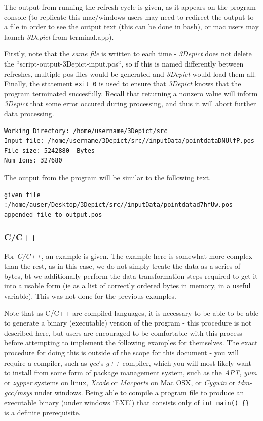 \documentclass[10pt]{article}
\begin{document}
The output from running the refresh cycle is given, as it appears on the program console (to replicate this mac/windows users may need to redirect the output to a file in order to see the output text (this can be done in bash), or mac users may launch \emph{3Depict} from terminal.app).

Firstly, note that the \emph{same file} is written to each time - \emph{3Depict} does not delete the ``script-output-3Depict-input.pos``, so if this is named differently between refreshes, multiple pos files would be generated and \emph{3Depict} would load them all. Finally, the statement \texttt{exit 0} is used to ensure that \emph{3Depict} knows that the program terminated succesfully. Recall that returning a nonzero value will inform \emph{3Depict} that some error occured during processing, and thus it will abort further data processing.

\begin{verbatim}
Working Directory: /home/username/3Depict/src
Input file: /home/username/3Depict/src//inputData/pointdataDNUlfP.pos
File size: 5242880  Bytes
Num Ions: 327680
\end{verbatim}

The output from the program will be similar to the following text.
\begin{verbatim}
given file :/home/auser/Desktop/3Depict/src//inputData/pointdatad7hfUw.pos
appended file to output.pos
\end{verbatim}

\subsubsection{C/C++}
For \emph{C/C++}, an example is given. The example here is somewhat more complex than the rest, as in this case, we do not simply treate the data as a series of bytes, bt we additionally perform the data transformation steps required to get it into a usable form (ie as a list of correctly ordered bytes in memory, in a useful variable). This was not done for the previous examples.

Note that as C/C++ are compiled languages, it is necessary to be able to be able to generate a binary (executable) version of the program - this procedure is not described here, but users are encouraged to be comfortable with this process before attempting to implement the following examples for themselves. The exact procedure for doing this is outside of the scope for this document - you will require a compiler, such as \emph{gcc}'s \emph{g++} compiler, which you will most likely want to install from some form of package management system, such as the \emph{APT}, \emph{yum} or \emph{zypper} systems on linux, \emph{Xcode} or \emph{Macports} on Mac OSX, or \emph{Cygwin} or \emph{tdm-gcc/msys} under windows. Being able to compile a program file to produce an executable binary (under windows `EXE') that consists only of \texttt{int main() \{\} } is a definite prerequisite.
\end{document}
